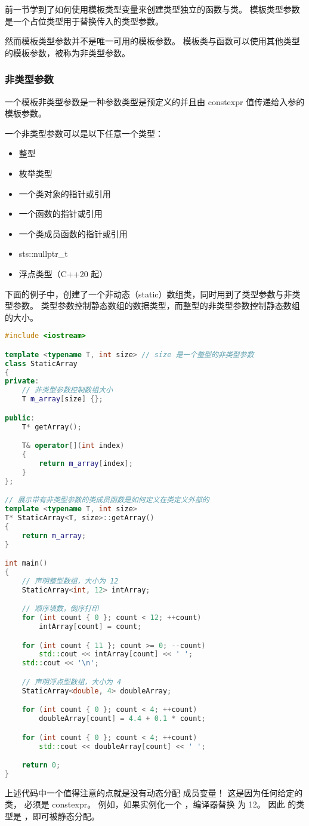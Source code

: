 \documentclass[../../LearnCpp.tex]{subfiles}
\begin{document}

前一节学到了如何使用模板类型变量来创建类型独立的函数与类。
模板类型参数是一个占位类型用于替换传入的类型参数。

然而模板类型参数并不是唯一可用的模板参数。
模板类与函数可以使用其他类型的模板参数，被称为非类型参数。

\subsubsection*{非类型参数}

一个模板非类型参数是一种参数类型是预定义的并且由 constexpr 值传递给入参的模板参数。

一个非类型参数可以是以下任意一个类型：

\begin{itemize}
    \item 整型
    \item 枚举类型
    \item 一个类对象的指针或引用
    \item 一个函数的指针或引用
    \item 一个类成员函数的指针或引用
    \item sts::nullptr\_t
    \item 浮点类型（C++20 起）
\end{itemize}

下面的例子中，创建了一个非动态（static）数组类，同时用到了类型参数与非类型参数。
类型参数控制静态数组的数据类型，而整型的非类型参数控制静态数组的大小。

\begin{lstlisting}[language=C++]
#include <iostream>

template <typename T, int size> // size 是一个整型的非类型参数
class StaticArray
{
private:
    // 非类型参数控制数组大小
    T m_array[size] {};

public:
    T* getArray();

    T& operator[](int index)
    {
        return m_array[index];
    }
};

// 展示带有非类型参数的类成员函数是如何定义在类定义外部的
template <typename T, int size>
T* StaticArray<T, size>::getArray()
{
    return m_array;
}

int main()
{
    // 声明整型数组，大小为 12
    StaticArray<int, 12> intArray;

    // 顺序填数，倒序打印
    for (int count { 0 }; count < 12; ++count)
        intArray[count] = count;

    for (int count { 11 }; count >= 0; --count)
        std::cout << intArray[count] << ' ';
    std::cout << '\n';

    // 声明浮点型数组，大小为 4
    StaticArray<double, 4> doubleArray;

    for (int count { 0 }; count < 4; ++count)
        doubleArray[count] = 4.4 + 0.1 * count;

    for (int count { 0 }; count < 4; ++count)
        std::cout << doubleArray[count] << ' ';

    return 0;
}
\end{lstlisting}

上述代码中一个值得注意的点就是没有动态分配  成员变量！
这是因为任何给定的  类， 必须是 constexpr。
例如，如果实例化一个 ，编译器替换  为 12。
因此  的类型是 ，即可被静态分配。
\end{document}
